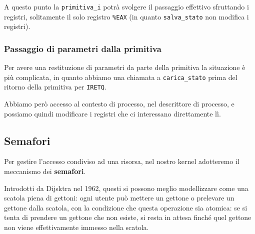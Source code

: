 \documentclass[a4paper,11pt]{article}
\begin{document}
A questo punto la \lstinline|primitiva_i| potrà svolgere il passaggio effettivo sfruttando i registri, solitamente il solo registro \lstinline|%EAX| (in quanto \lstinline|salva_stato| non modifica i registri).

\subsubsection{Passaggio di parametri dalla primitiva}
Per avere una restituzione di parametri da parte della primitiva la situazione è più complicata, in quanto abbiamo una chiamata a \lstinline|carica_stato| prima del ritorno della primitiva per \lstinline|IRETQ|.

Abbiamo però accesso al contesto di processo, nel descrittore di processo, e possiamo quindi modificare i registri che ci interessano direttamente lì.

\subsection{Semafori}
Per gestire l'accesso condiviso ad una risorsa, nel nostro kernel adotteremo il meccanismo dei \textbf{semafori}.

Introdotti da Dijsktra nel 1962, questi si possono meglio modellizzare come una scatola piena di gettoni: ogni utente può mettere un gettone o prelevare un gettone dalla scatola, con la condizione che questa operazione sia atomica: se si tenta di prendere un gettone che non esiste, si resta in attesa finché quel gettone non viene effettivamente immesso nella scatola.
\end{document}
